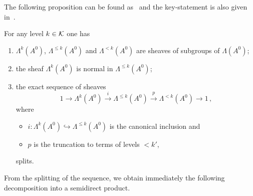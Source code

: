 The following proposition can be found as~\cite[Prop.I.5.1]{Loday1994} and the
key-statement is also given in~\cite[Prop.4.10]{Martinet1991}.
\begin{prop}\label{prop:PropertiesOfStokesSheafSplitting}
  For any level $k\in\mathcal{K}$ one has
  \begin{enumerate}
    \item $\Lambda^{k}(A^0)$, $\Lambda^{\leq k}(A^0)$ and $\Lambda^{<k}(A^0)$
      are sheaves of subgroups of $\Lambda(A^0)$;
    \item the sheaf $\Lambda^k(A^0)$ is normal in $\Lambda^{\leq k}(A^0)$;
      \begin{comment}
        A subgroup $N$ is normal in $G$ ($N\vartriangleleft G$) if it is stable
        under conjugation, i.e.
        \[
          N\vartriangleleft G \Leftrightarrow \forall n\in N \forall g\in G,
          gng^{-1}\in N ,.
        \]
      \end{comment}
    \item {}
      the exact sequence of sheaves
      \[
        1\longrightarrow\Lambda^k(A^0)
        \overset{i}\longrightarrow\Lambda^{\leq k}(A^0)
        \overset{p}\longrightarrow\Lambda^{<k}(A^0)
        \longrightarrow 1 \,,
      \]
      where
      \begin{itemize}
        \item $i:\Lambda^k(A^0)\hookrightarrow\Lambda^{\leq k}(A^0)$ is the
          canonical inclusion and
        \item $p$ is the truncation to terms of levels $<k'$,
      \end{itemize}
      splits.
  \end{enumerate}
\end{prop}
From the splitting of the sequence, we obtain immediately the following
decomposition into a semidirect product.
